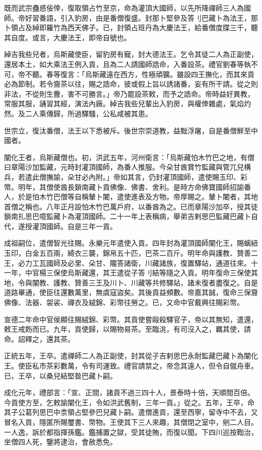 \begin{pinyinscope}
既而武宗蠱惑佞倖，復取領占竹至京，命為灌頂大國師，以先所降禪師三人為國師。帝好習番語，引入豹房，由是番僧復盛。封那卜堅參及答刂巴藏卜為法王，那卜領占及綽即羅竹為西天佛子。已，封領占班丹為大慶法王，給番僧度牒三千，聽其自度。或言，大慶法王，即帝自號也。

綽吉我些兒者，烏斯藏使臣，留豹房有寵，封大德法王。乞令其徒二人為正副使，還居本土，如大乘法王例入貢，且為二人請國師誥命，入番設茶。禮官劉春等執不可，帝不聽。春等復言：「烏斯藏遠在西方，性極頑獷。雖設四王撫化，而其來貢必為節制。若令齎茶以往，賜之誥命，彼或假上旨以誘諸番，妄有所干請。從之則非法，不從則生釁，害不可勝言。」帝乃罷設茶敕，而予之誥命。帝時益好異教，常服其服，誦習其經，演法內廠。綽吉我些兒輩出入豹房，與權倖雜處，氣焰灼然。及二人乘傳歸，所過驛騷，公私咸被其患。

世宗立，復汰番僧，法王以下悉被斥。後世宗崇道教，益黜浮屠，自是番僧鮮至中國者。

闡化王者，烏斯藏僧也。初，洪武五年，河州衛言：「烏斯藏怕木竹巴之地，有僧曰章陽沙加監藏，元時封灌頂國師，為番人推服。今朵甘酋賞竹監藏與管兀兒構兵，若遣此僧撫諭，朵甘必內附。」帝如其言，仍封灌頂國師，遣使賜玉印、彩幣。明年，其僧使酋長鎖南藏卜貢佛像、佛書、舍利。是時方命佛寶國師招諭番人，於是怕木竹巴僧等自稱輦卜闍，遣使進表及方物。帝厚賜之。輦卜闍者，其地首僧之稱也。八年正月設怕木竹巴萬戶府，以番酋為之。已而章陽沙加卒，授其徒鎖南扎思巴噫監藏卜為灌頂國師。二十一年上表稱病，舉弟吉剌思巴監藏巴藏卜自代，遂授灌頂國師。自是三年一貢。

成祖嗣位，遣僧智光往賜。永樂元年遣使入貢。四年封為灌頂國師闡化王，賜螭紐玉印，白金五百兩，綺衣三襲，錦帛五十匹，巴茶二百斤。明年命與護教、贊善二王，必力工瓦國師及必里、朵甘、隴答諸衛，川藏諸族，復置驛站，通道往來。十一年，中官楊三保使烏斯藏還，其王遣從子答刂結等隨之入貢。明年復命三保使其地，令與闡教、護教、贊善三王及川卜、川藏等共修驛站，諸未復者盡復之。自是道路畢通，使臣往還數萬里，無虞寇盜矣。其後貢益頻數。帝嘉其誠，復命三保齎佛像、法器、袈裟、禪衣及絨錦、彩幣往勞之。已，又命中官戴興往賜彩幣。

宣德二年命中官侯顯往賜絨錦、彩幣。其貢使嘗毆殺驛官子，帝以其無知，遣還，敕王戒飭而已。九年，貢使歸，以賜物易茶。至臨洮，有司沒入之，羈其使，請命。詔釋之，還其茶。

正統五年，王卒。遣禪師二人為正副使，封其從子吉剌思巴永耐監藏巴藏卜為闡化王。使臣私市茶彩數萬，令有司運致。禮官請禁之，帝念其遠人，但令自僦舟車。已，王卒，以桑兒結堅昝巴藏卜嗣。

成化元年，禮部言：「宣、正間，諸貢不過三四十人，景泰時十倍，天順間百倍。今貢使方至，乞敕諭闡化王，令如洪武舊制，三年一貢。」從之。五年，王卒，命其子公葛列思巴中柰領占堅參巴兒藏卜嗣。遣僧進貢，還至西寧，留寺中不去，又冒名入貢，隱匿所賜璽書、幣物。王使其下三人來趣，其僧閉之室中，剜二人目。一人逸，訴於都指揮孫鑑。鑑捕置之獄，受其徒賄，而復以聞。下四川巡按鞫治，坐僧四人死，鑒將逮治，會赦悉免。


\end{pinyinscope}
